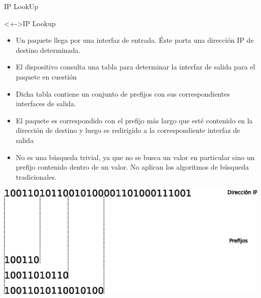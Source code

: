 \documentclass[xcolor=dvipsnames]{beamer}
\begin{document}
\begin{frame}{IP LookUp}
 \begin{block}<+->{IP Lookup}   
    \begin{itemize}
      \scriptsize
      \item Un paquete llega por una interfaz de entrada. Éste porta una dirección IP de destino determinada.
      \item El dispositivo consulta una tabla para determinar la interfaz de salida para el paquete en cuestión
      \item Dicha tabla contiene un conjunto de prefijos con sus correspondientes interfaces de salida.
      \item El paquete es correspondido con el prefijo más largo que esté contenido en la dirección de destino y luego es redirigido  a la correspondiente interfaz de salida
      \item No es una búsqueda trivial, ya que no se busca un valor en particular sino un prefijo contenido dentro de un valor. No aplican los algoritmos de búsqueda tradicionales.   
    \end{itemize}
\center 
\includegraphics[scale=0.50]{figures/prefijos.eps}
  \end{block}
\end{frame}
\end{document}
